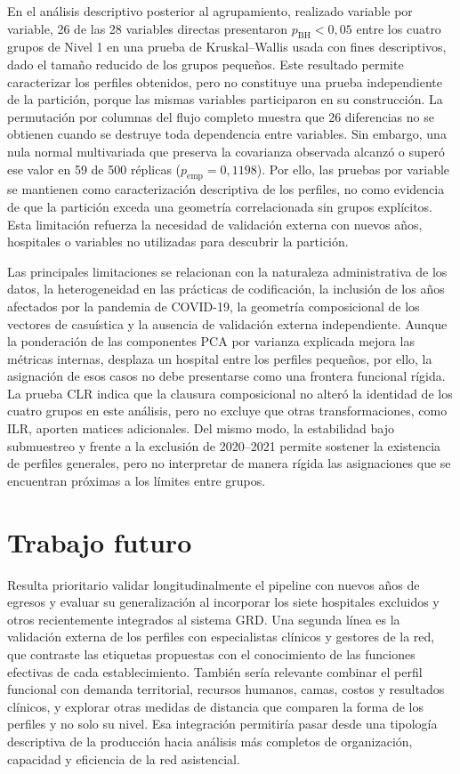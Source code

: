 En el análisis descriptivo posterior al agrupamiento, realizado variable por
variable, 26 de las 28 variables directas presentaron $p_{\text{BH}}<0{,}05$
entre los cuatro grupos de Nivel 1 en una prueba de Kruskal--Wallis usada con
fines descriptivos, dado el tamaño reducido de los grupos pequeños. Este resultado permite caracterizar los perfiles obtenidos, pero no
constituye una prueba independiente de la partición, porque las mismas variables
participaron en su construcción. La permutación por columnas del flujo completo
muestra que 26 diferencias no se obtienen cuando se destruye toda dependencia
entre variables. Sin embargo, una nula normal multivariada que preserva la
covarianza observada alcanzó o superó ese valor en 59 de 500 réplicas
($p_{\mathrm{emp}}=0{,}1198$). Por ello, las pruebas por variable se mantienen
como caracterización descriptiva de los perfiles, no como evidencia de que la
partición exceda una geometría correlacionada sin grupos explícitos. Esta
limitación refuerza la necesidad de validación externa con nuevos años,
hospitales o variables no utilizadas para descubrir la partición.

Las principales limitaciones se relacionan con la naturaleza administrativa de
los datos, la heterogeneidad en las prácticas de codificación, la inclusión de
los años afectados por la pandemia de COVID-19, la geometría composicional de
los vectores de casuística y la ausencia de validación externa independiente.
Aunque la ponderación de las componentes PCA por varianza explicada mejora las
métricas internas, desplaza un hospital entre los perfiles pequeños, por ello,
la asignación de esos casos no debe presentarse como una frontera funcional
rígida.
La prueba CLR indica que la clausura composicional no alteró la identidad de los
cuatro grupos en este análisis, pero no excluye que otras transformaciones, como
ILR, aporten matices adicionales. Del mismo modo, la estabilidad bajo
submuestreo y frente a la exclusión de 2020--2021 permite
sostener la existencia de perfiles generales, pero no interpretar de manera
rígida las asignaciones que se encuentran próximas a los límites entre grupos.

\section{Trabajo futuro}

Resulta prioritario validar longitudinalmente el pipeline con nuevos años de
egresos y evaluar su generalización al incorporar los siete hospitales
excluidos y otros recientemente integrados al sistema GRD. Una segunda línea es
la validación externa de los perfiles con especialistas clínicos y gestores de
la red, que contraste las etiquetas propuestas con el conocimiento de las
funciones efectivas de cada establecimiento. También sería relevante combinar
el perfil funcional con demanda territorial, recursos humanos, camas, costos y
resultados clínicos, y explorar otras medidas de distancia que comparen la
forma de los perfiles y no solo su nivel. Esa integración permitiría pasar
desde una tipología descriptiva de la producción hacia análisis más completos
de organización, capacidad y eficiencia de la red asistencial.
